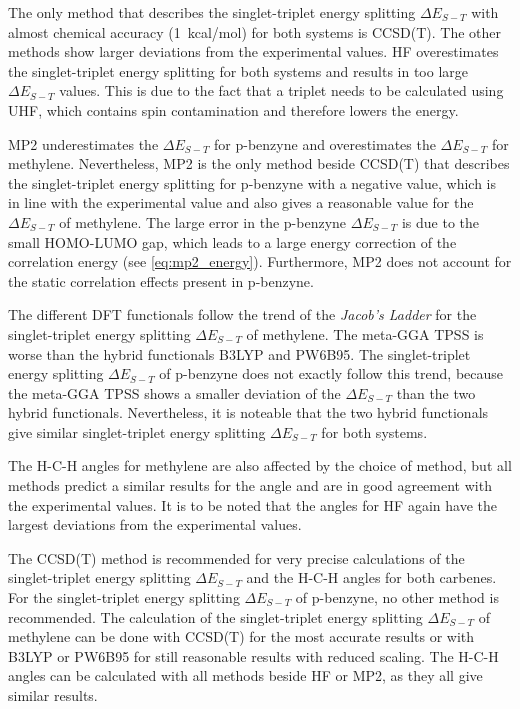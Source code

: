 \documentclass[fontsize=11pt,a4paper,oneside]{scrartcl}
\begin{document}
The only method that describes the singlet-triplet energy splitting $\Delta E_{S-T}$ with almost chemical accuracy (1~kcal/mol) for both systems is \ac{CCSD(T)}. The other methods show larger deviations from the experimental values. \Ac{HF} overestimates the singlet-triplet energy splitting for both systems and results in too large $\Delta E_{S-T}$ values. This is due to the fact that a triplet needs to be calculated using \ac{UHF}, which contains spin contamination and therefore lowers the energy.

\Ac{MP2} underestimates the $\Delta E_{S-T}$ for p-benzyne and overestimates the $\Delta E_{S-T}$ for methylene. Nevertheless, \ac{MP2} is the only method beside \ac{CCSD(T)} that describes the singlet-triplet energy splitting for p-benzyne with a negative value, which is in line with the experimental value and also gives a reasonable value for the $\Delta E_{S-T}$ of methylene. The large error in the p-benzyne $\Delta E_{S-T}$ is due to the small HOMO-LUMO gap, which leads to a large energy correction of the correlation energy (see \autoref{eq:mp2_energy}). Furthermore, \ac{MP2} does not account for the static correlation effects present in p-benzyne.

The different \ac{DFT} functionals follow the trend of the \textit{Jacob's Ladder} for the singlet-triplet energy splitting $\Delta E_{S-T}$ of methylene. The meta-GGA \ac{TPSS} is worse than the hybrid functionals \ac{B3LYP} and \ac{PW6B95}. The singlet-triplet energy splitting $\Delta E_{S-T}$ of p-benzyne does not exactly follow this trend, because the meta-GGA \ac{TPSS} shows a smaller deviation of the $\Delta E_{S-T}$ than the two hybrid functionals. Nevertheless, it is noteable that the two hybrid functionals give similar singlet-triplet energy splitting $\Delta E_{S-T}$ for both systems.

The H-C-H angles for methylene are also affected by the choice of method, but all methods predict a similar results for the angle and are in good agreement with the experimental values. It is to be noted that the angles for \ac{HF} again have the largest deviations from the experimental values.

The \ac{CCSD(T)} method is recommended for very precise calculations of the singlet-triplet energy splitting $\Delta E_{S-T}$ and the H-C-H angles for both carbenes. For the singlet-triplet energy splitting $\Delta E_{S-T}$ of p-benzyne, no other method is recommended. The calculation of the singlet-triplet energy splitting $\Delta E_{S-T}$ of methylene can be done with \ac{CCSD(T)} for the most accurate results or with \ac{B3LYP} or \ac{PW6B95} for still reasonable results with reduced scaling. The H-C-H angles can be calculated with all methods beside \ac{HF} or \ac{MP2}, as they all give similar results.
\end{document}
